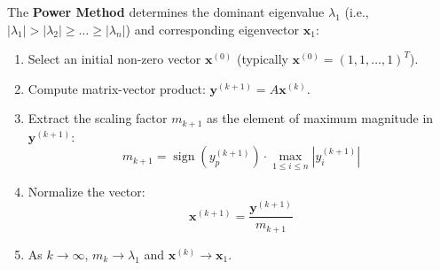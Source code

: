\begin{theorembox}
The \textbf{Power Method} determines the dominant eigenvalue $\lambda_1$ (i.e., $|\lambda_1| > |\lambda_2| \ge \dots \ge |\lambda_n|$) and corresponding eigenvector $\mathbf{x}_1$:
\begin{enumerate}
    \item Select an initial non-zero vector $\mathbf{x}^{(0)}$ (typically $\mathbf{x}^{(0)} = (1, 1, \dots, 1)^T$).
    \item Compute matrix-vector product: $\mathbf{y}^{(k+1)} = A \mathbf{x}^{(k)}$.
    \item Extract the scaling factor $m_{k+1}$ as the element of maximum magnitude in $\mathbf{y}^{(k+1)}$:
    \begin{equation}
        m_{k+1} = \operatorname{sign}(y^{(k+1)}_p) \cdot \max_{1 \le i \le n} |y^{(k+1)}_i|
    \end{equation}
    \item Normalize the vector:
    \begin{equation}
        \mathbf{x}^{(k+1)} = \frac{\mathbf{y}^{(k+1)}}{m_{k+1}}
    \end{equation}
    \item As $k \to \infty$, $m_k \to \lambda_1$ and $\mathbf{x}^{(k)} \to \mathbf{x}_1$.
\end{enumerate}
\end{theorembox}

